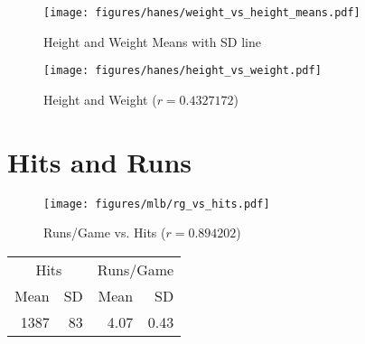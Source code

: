 \documentclass[letterpaper]{article}
\begin{document}
  \begin{figure}[H]
    \centering
    \texttt{[image: figures/hanes/weight\_vs\_height\_means.pdf]}
    \caption{Height and Weight Means with SD line}
  \end{figure}

  \begin{figure}[H]
    \centering
    \texttt{[image: figures/hanes/height\_vs\_weight.pdf]}
    \caption{Height and Weight ($r = 0.4327172$)}
  \end{figure}


  \newpage

  \section{Hits and Runs} %
  
  \begin{figure}[H]
    \centering
    \texttt{[image: figures/mlb/rg\_vs\_hits.pdf]}
    \caption{Runs/Game vs. Hits ($r = 0.894202$)}
  \end{figure}

  \begin{table}[ht]
    \centering
    \begin{tabular}{rrrr}
      \toprule
      \multicolumn{2}{c}{Hits} & \multicolumn{2}{c}{Runs/Game} \\
      Mean & SD & Mean & SD \\
      \cmidrule(r){1-2}\cmidrule(l){3-4} 
      1387 & 83 & 4.07 & 0.43 \\
      \bottomrule
    \end{tabular}
  \end{table}
\end{document}
